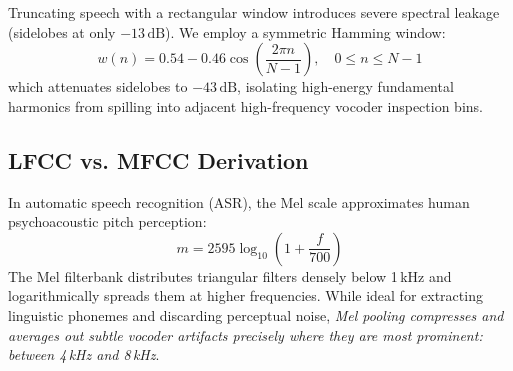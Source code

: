 \documentclass[runningheads]{llncs}
\begin{document}
Truncating speech with a rectangular window introduces severe spectral leakage (sidelobes at only $-13\,\text{dB}$). We employ a symmetric Hamming window:
\begin{equation}
w(n) = 0.54 - 0.46 \cos\left(\frac{2\pi n}{N-1}\right), \quad 0 \le n \le N-1
\end{equation}
which attenuates sidelobes to $-43\,\text{dB}$, isolating high-energy fundamental harmonics from spilling into adjacent high-frequency vocoder inspection bins.

\subsection{LFCC vs. MFCC Derivation}
In automatic speech recognition (ASR), the Mel scale approximates human psychoacoustic pitch perception:
\begin{equation}
m = 2595 \log_{10}\left(1 + \frac{f}{700}\right)
\end{equation}
The Mel filterbank distributes triangular filters densely below 1\,kHz and logarithmically spreads them at higher frequencies. While ideal for extracting linguistic phonemes and discarding perceptual noise, \textit{Mel pooling compresses and averages out subtle vocoder artifacts precisely where they are most prominent: between 4\,kHz and 8\,kHz}.
\end{document}
